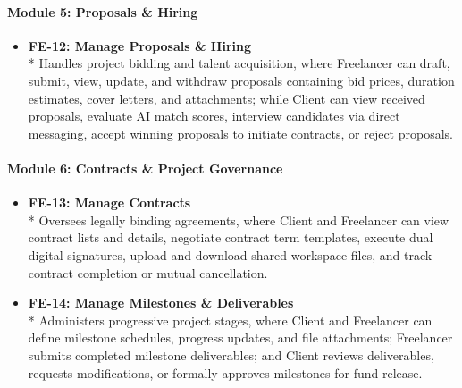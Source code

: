 \paragraph*{Module 5: Proposals \& Hiring}
\begin{itemize}[leftmargin=1.0cm, label=--]

\item \textbf{FE-12: Manage Proposals \& Hiring} \\*
Handles project bidding and talent acquisition, where Freelancer can draft, submit, view, update, and withdraw proposals containing bid prices, duration estimates, cover letters, and attachments; while Client can view received proposals, evaluate AI match scores, interview candidates via direct messaging, accept winning proposals to initiate contracts, or reject proposals.

\end{itemize}

\paragraph*{Module 6: Contracts \& Project Governance}
\begin{itemize}[leftmargin=1.0cm, label=--]

\item \textbf{FE-13: Manage Contracts} \\*
Oversees legally binding agreements, where Client and Freelancer can view contract lists and details, negotiate contract term templates, execute dual digital signatures, upload and download shared workspace files, and track contract completion or mutual cancellation.

\item \textbf{FE-14: Manage Milestones \& Deliverables} \\*
Administers progressive project stages, where Client and Freelancer can define milestone schedules, progress updates, and file attachments; Freelancer submits completed milestone deliverables; and Client reviews deliverables, requests modifications, or formally approves milestones for fund release.

\end{itemize}

